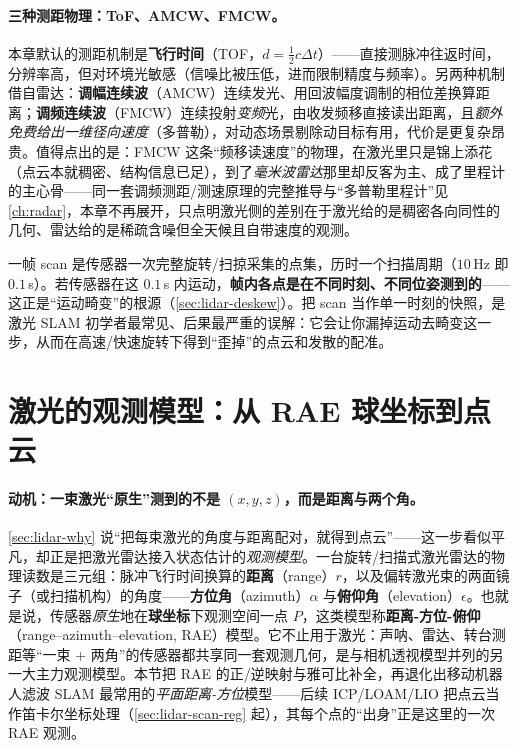 \paragraph{三种测距物理：ToF、AMCW、FMCW。}\label{par:lidar-ranging}
本章默认的测距机制是\textbf{飞行时间}（TOF，$d=\tfrac12 c\Delta t$）——直接测脉冲往返时间，分辨率高，但对环境光敏感（信噪比被压低，进而限制精度与频率）\cite{carlone2026handbook}。另两种机制借自雷达：\textbf{调幅连续波}（AMCW）连续发光、用回波幅度调制的相位差换算距离；\textbf{调频连续波}（FMCW）连续投射\emph{变频}光，由收发频移直接读出距离，且\emph{额外免费给出一维径向速度}（多普勒），对动态场景剔除动目标有用，代价是更复杂昂贵。值得点出的是：FMCW 这条“频移读速度”的物理，在激光里只是锦上添花（点云本就稠密、结构信息已足），到了\emph{毫米波雷达}那里却反客为主、成了里程计的主心骨——同一套调频测距/测速原理的完整推导与“多普勒里程计”见 \cref{ch:radar}，本章不再展开，只点明激光侧的差别在于激光给的是稠密各向同性的几何、雷达给的是稀疏含噪但全天候且自带速度的观测。

\begin{pitfall}
一帧 scan 是传感器一次完整旋转/扫掠采集的点集，历时一个扫描周期（$10$\,Hz 即 $0.1$\,s）。若传感器在这 $0.1$\,s 内运动，\textbf{帧内各点是在不同时刻、不同位姿测到的}——这正是“运动畸变”的根源（\cref{sec:lidar-deskew}）。把 scan 当作单一时刻的快照，是激光 SLAM 初学者最常见、后果最严重的误解：它会让你漏掉运动去畸变这一步，从而在高速/快速旋转下得到“歪掉”的点云和发散的配准。
\end{pitfall}

\section{激光的观测模型：从 RAE 球坐标到点云}
\label{sec:lidar-rae}

\paragraph{动机：一束激光“原生”测到的不是 $(x,y,z)$，而是距离与两个角。}
\cref{sec:lidar-why} 说“把每束激光的角度与距离配对，就得到点云”——这一步看似平凡，却正是把激光雷达接入状态估计的\emph{观测模型}。一台旋转/扫描式激光雷达的物理读数是三元组：脉冲飞行时间换算的\textbf{距离}（range）$r$，以及偏转激光束的两面镜子（或扫描机构）的角度——\textbf{方位角}（azimuth）$\alpha$ 与\textbf{俯仰角}（elevation）$\epsilon$。也就是说，传感器\emph{原生}地在\textbf{球坐标}下观测空间一点 $P$，这类模型称\textbf{距离-方位-俯仰}（range–azimuth–elevation, RAE）模型\cite{barfoot2024state}。它不止用于激光：声呐、雷达、转台测距等“一束 + 两角”的传感器都共享同一套观测几何，是与相机透视模型并列的另一大主力观测模型。本节把 RAE 的正/逆映射与雅可比补全，再退化出移动机器人滤波 SLAM 最常用的\emph{平面距离-方位}模型——后续 ICP/LOAM/LIO 把点云当作笛卡尔坐标处理（\cref{sec:lidar-scan-reg} 起），其每个点的“出身”正是这里的一次 RAE 观测。

